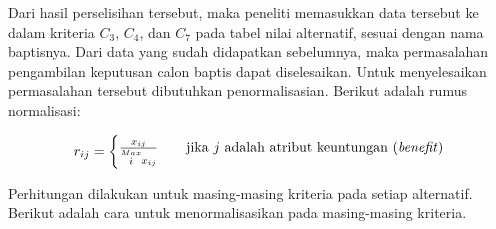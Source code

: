 Dari hasil perselisihan tersebut, maka peneliti memasukkan data tersebut ke dalam kriteria $C_{3}$, $C_{4}$, dan $C_{7}$ pada tabel nilai alternatif, sesuai dengan nama baptisnya. Dari data yang sudah didapatkan sebelumnya, maka permasalahan pengambilan keputusan calon baptis dapat diselesaikan. Untuk menyelesaikan permasalahan tersebut dibutuhkan penormalisasian. Berikut adalah rumus normalisasi:

	\[ r_{ij}  =
  \begin{cases}
    \frac{x_{ij}}{\stackrel{Max}{i} x_{ij}}      & \quad \text{jika } j \text{ adalah atribut keuntungan (\textit{benefit})}\\
	\end{cases}	  
\]

Perhitungan dilakukan untuk masing-masing kriteria pada setiap alternatif. Berikut adalah cara untuk menormalisasikan pada masing-masing kriteria.

